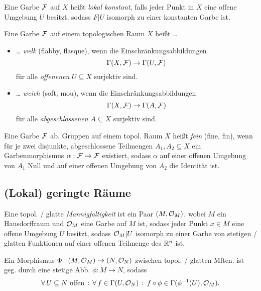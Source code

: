 \documentclass{cheat-sheet}
\begin{document}
\begin{defn}
  Eine Garbe $\mathcal{F}$ auf $X$ heißt \emph{lokal konstant}, falls jeder Punkt in $X$ eine offene Umgebung $U$ besitzt, sodass $F|U$ isomorph zu einer konstanten Garbe ist.
\end{defn}

\begin{defn}
   Eine Garbe $\mathcal{F}$ auf einem topologischen Raum $X$ heißt \ldots{}
  \begin{itemize}
    \item \ldots{} \emph{welk} (flabby, flasque), wenn die Einschränkungsabbildungen
    \[ \Gamma(X, \mathcal{F}) \to \Gamma(U, \mathcal{F}) \]
    für alle {\em offenenen} $U \subseteq X$ surjektiv sind.
    \item \ldots{} \emph{weich} (soft, mou), wenn die Einschränkungsabbildungen
    \[ \Gamma(X, \mathcal{F}) \to \Gamma(A, \mathcal{F}) \]
    für alle {\em abgeschlossenen} $A \subseteq X$ surjektiv sind.
  \end{itemize}
\end{defn}

\begin{defn}
   Eine Garbe $\mathcal{F}$ ab. Gruppen auf einem topol. Raum $X$ heißt \emph{fein} (fine, fin), wenn für je zwei disjunkte, abgeschlossene Teilmengen $A_1, A_2 \subseteq X$ ein Garbenmorphismus $\alpha : \mathcal{F} \to \mathcal{F}$ existiert, sodass $\alpha$ auf einer offenen Umgebung von $A_1$ Null und auf einer offenen Umgebung von $A_2$ die Identität ist.
\end{defn}

\begin{samepage}
  \subsection{(Lokal) geringte Räume}
\end{samepage}


\begin{defn}
  Eine topol. / glatte \emph{Mannigfaltigkeit} ist ein Paar $(M, \mathcal{O}_M)$, wobei $M$ ein Hausdorffraum und $\mathcal{O}_M$ eine Garbe auf $M$ ist, sodass jeder Punkt $x \in M$ eine offene Umgebung $U$ besitzt, sodass $\mathcal{O}_M|U$ isomorph zu einer Garbe von stetigen / glatten Funktionen auf einer offenen Teilmenge des $\mathbb{R}^n$ ist.
\end{defn}

\begin{defn}
  Ein Morphismus $\Phi : (M, \mathcal{O}_M) \to (N, \mathcal{O}_N)$ zwischen topol. / glatten Mften. ist geg. durch eine stetige Abb. $\phi : M \to N$, sodass
  \[
    \forall \, {U \subseteq N \text{ offen}} \,:\, \forall \, {f \in \Gamma(U, \mathcal{O}_N)} \,:\, f \circ \phi \in \Gamma(\phi^{-1}(U), \mathcal{O}_M).
  \]
\end{defn}
\end{document}
